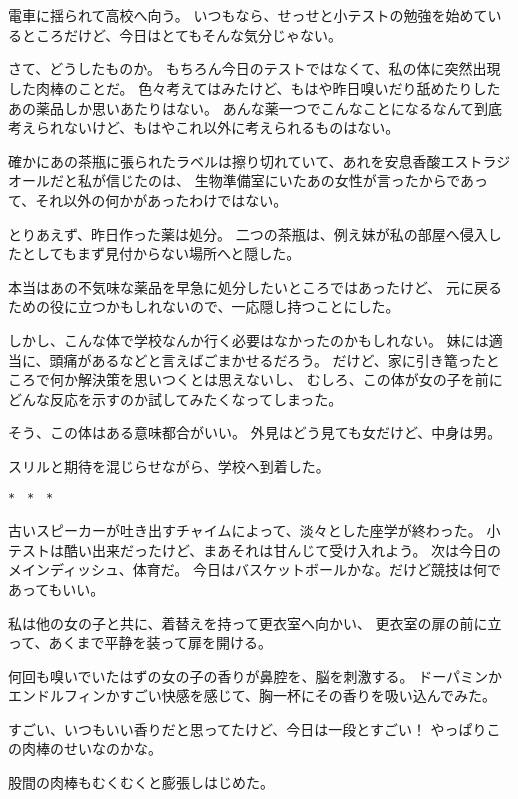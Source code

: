 \section{}
電車に揺られて高校へ向う。
いつもなら、せっせと小テストの勉強を始めているところだけど、今日はとてもそんな気分じゃない。

さて、どうしたものか。
もちろん今日のテストではなくて、私の体に突然出現した肉棒のことだ。
色々考えてはみたけど、もはや昨日嗅いだり舐めたりしたあの薬品しか思いあたりはない。
あんな薬一つでこんなことになるなんて到底考えられないけど、もはやこれ以外に考えられるものはない。

確かにあの茶瓶に張られたラベルは擦り切れていて、あれを安息香酸エストラジオールだと私が信じたのは、
生物準備室にいたあの女性が言ったからであって、それ以外の何かがあったわけではない。

とりあえず、昨日作った薬は処分。
二つの茶瓶は、例え妹が私の部屋へ侵入したとしてもまず見付からない場所へと隠した。

本当はあの不気味な薬品を早急に処分したいところではあったけど、
元に戻るための役に立つかもしれないので、一応隠し持つことにした。

しかし、こんな体で学校なんか行く必要はなかったのかもしれない。
妹には適当に、頭痛があるなどと言えばごまかせるだろう。
だけど、家に引き篭ったところで何か解決策を思いつくとは思えないし、
むしろ、この体が女の子を前にどんな反応を示すのか試してみたくなってしまった。

そう、この体はある意味都合がいい。
外見はどう見ても女だけど、中身は男。

スリルと期待を混じらせながら、学校へ到着した。

\begin{verbatim}
*　*　*
\end{verbatim}

古いスピーカーが吐き出すチャイムによって、淡々とした座学が終わった。
小テストは酷い出来だったけど、まあそれは甘んじて受け入れよう。
次は今日のメインディッシュ、体育だ。
今日はバスケットボールかな。だけど競技は何であってもいい。

私は他の女の子と共に、着替えを持って更衣室へ向かい、
更衣室の扉の前に立って、あくまで平静を装って扉を開ける。

何回も嗅いでいたはずの女の子の香りが鼻腔を、脳を刺激する。
ドーパミンかエンドルフィンかすごい快感を感じて、胸一杯にその香りを吸い込んでみた。

すごい、いつもいい香りだと思ってたけど、今日は一段とすごい！
やっぱりこの肉棒のせいなのかな。

股間の肉棒もむくむくと膨張しはじめた。

